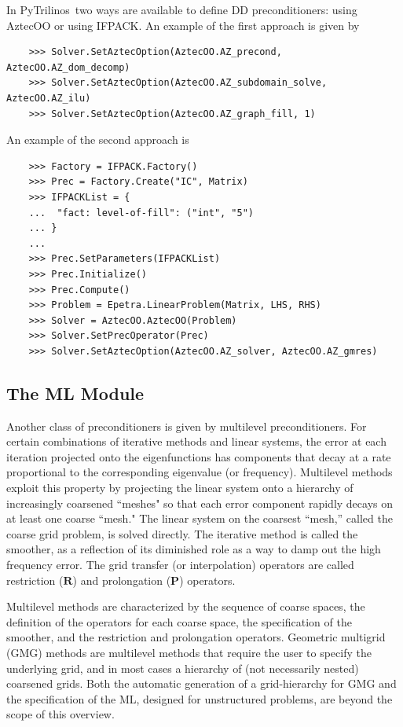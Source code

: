\documentclass[10pt,relax]{SANDreport}
\newcommand{\PyTrilinos}{{PyTrilinos}}
\begin{document}
In \PyTrilinos\ two ways are available to define DD preconditioners:
using AztecOO or using IFPACK. An example of the first approach is
given by
\begin{verbatim}
    >>> Solver.SetAztecOption(AztecOO.AZ_precond, AztecOO.AZ_dom_decomp)
    >>> Solver.SetAztecOption(AztecOO.AZ_subdomain_solve, AztecOO.AZ_ilu)
    >>> Solver.SetAztecOption(AztecOO.AZ_graph_fill, 1)
\end{verbatim}
An example of the second approach is
\begin{verbatim}
    >>> Factory = IFPACK.Factory()
    >>> Prec = Factory.Create("IC", Matrix)
    >>> IFPACKList = {
    ...  "fact: level-of-fill": ("int", "5")
    ... }
    ... 
    >>> Prec.SetParameters(IFPACKList)
    >>> Prec.Initialize()
    >>> Prec.Compute()
    >>> Problem = Epetra.LinearProblem(Matrix, LHS, RHS)
    >>> Solver = AztecOO.AztecOO(Problem)
    >>> Solver.SetPrecOperator(Prec)
    >>> Solver.SetAztecOption(AztecOO.AZ_solver, AztecOO.AZ_gmres)
\end{verbatim}

\subsection{The ML Module}
\label{subsec:ml}

Another class of preconditioners is given by multilevel
preconditioners.  For certain combinations of iterative methods and
linear systems, the error at each iteration projected onto the
eigenfunctions has components that decay at a rate proportional to the
corresponding eigenvalue (or frequency).  Multilevel methods exploit
this property \cite{Briggs} by projecting the linear system onto a
hierarchy of increasingly coarsened ``meshes" so that each error
component rapidly decays on at least one coarse ``mesh."  The linear
system on the coarsest ``mesh,'' called the coarse grid problem, is
solved directly.  The iterative method is called the smoother, as a
reflection of its diminished role as a way to damp out the high
frequency error.  The grid transfer (or interpolation) operators are
called restriction ($\mathbf{R}$) and prolongation ($\mathbf{P}$)
operators.

Multilevel methods are characterized by the sequence of coarse spaces,
the definition of the operators for each coarse space, the
specification of the smoother, and the restriction and prolongation
operators.  Geometric multigrid (GMG) methods are multilevel methods
that require the user to specify the underlying grid, and in most
cases a hierarchy of (not necessarily nested) coarsened grids.  Both
the automatic generation of a grid-hierarchy for GMG and the
specification of the ML, designed for unstructured problems, are
beyond the scope of this overview.
\end{document}
